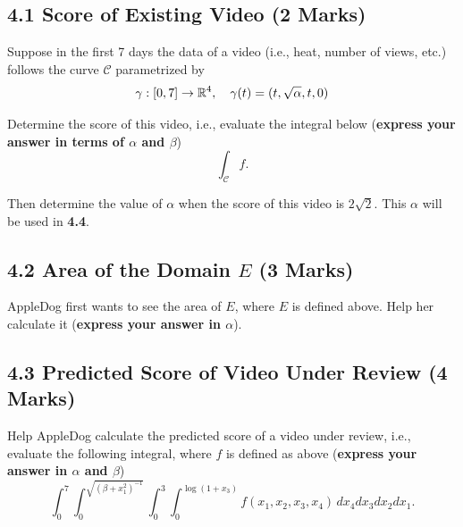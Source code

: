 \documentclass[12pt]{article}
\renewcommand{\emph}[1]{{\color{Turquoise3}\textsl{#1}}}
\begin{document}
\subsection*{4.1 Score of Existing Video (2 Marks)} 

\par Suppose in the first 7 days the data of a video (i.e., heat, number of views, etc.) follows the curve $\mathcal{C}$ parametrized by 
\begin{equation*}
    \gamma:[0,7]\to \mathbb{R}^4,\quad \gamma(t) = (t, \sqrt{\alpha}, t, 0)
\end{equation*}

\par Determine the score of this video, i.e., evaluate the integral below (\textbf{express your answer in terms of $\alpha$ and $\beta$}) 
\begin{equation*}
    \int_{\mathcal{C}}f. 
\end{equation*}

\par Then determine the value of $\alpha$ when the score of this video is $2\sqrt{2}$. This \emph{$\alpha$} will be used in \textbf{4.4}. 

\subsection*{4.2 Area of the Domain $E$ (3 Marks)} 
AppleDog first wants to see the area of $E$, where $E$ is defined above. Help her calculate it (\textbf{express your answer in $\alpha$}).  

\subsection*{4.3 Predicted Score of Video Under Review (4 Marks)}
Help AppleDog calculate the predicted score of a video under review, i.e., evaluate the following integral, where $f$ is defined as above (\textbf{express your answer in $\alpha$ and $\beta$}) 
\begin{equation*}
	    \int_0^7 \int_0^{\sqrt{(\beta + x_1^2)^{-1}}} \int_0^{3} \int_0^{\log(1 + x_3)} f(x_1, x_2, x_3, x_4)\,dx_4 dx_3 dx_2 dx_1.
\end{equation*}
\end{document}
